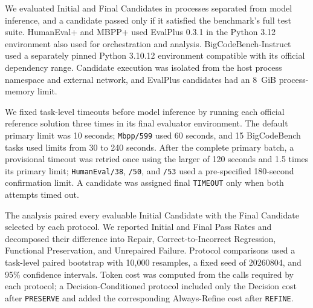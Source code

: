 We evaluated Initial and Final Candidates in processes separated from model inference, and a candidate passed only if it satisfied the benchmark's full test suite.
HumanEval+ and MBPP+ used EvalPlus 0.3.1 in the Python 3.12 environment also used for orchestration and analysis.
BigCodeBench-Instruct used a separately pinned Python 3.10.12 environment compatible with its official dependency range.
Candidate execution was isolated from the host process namespace and external network, and EvalPlus candidates had an 8~GiB process-memory limit.

We fixed task-level timeouts before model inference by running each official reference solution three times in its final evaluator environment.
The default primary limit was 10 seconds; \texttt{Mbpp/599} used 60 seconds, and 15 BigCodeBench tasks used limits from 30 to 240 seconds.
After the complete primary batch, a provisional timeout was retried once using the larger of 120 seconds and 1.5 times its primary limit; \texttt{HumanEval/38}, \texttt{/50}, and \texttt{/53} used a pre-specified 180-second confirmation limit.
A candidate was assigned final \texttt{TIMEOUT} only when both attempts timed out.

The analysis paired every evaluable Initial Candidate with the Final Candidate selected by each protocol.
We reported Initial and Final Pass Rates and decomposed their difference into Repair, Correct-to-Incorrect Regression, Functional Preservation, and Unrepaired Failure.
Protocol comparisons used a task-level paired bootstrap with 10,000 resamples, a fixed seed of 20260804, and 95\% confidence intervals.
Token cost was computed from the calls required by each protocol; a Decision-Conditioned protocol included only the Decision cost after \texttt{PRESERVE} and added the corresponding Always-Refine cost after \texttt{REFINE}.
